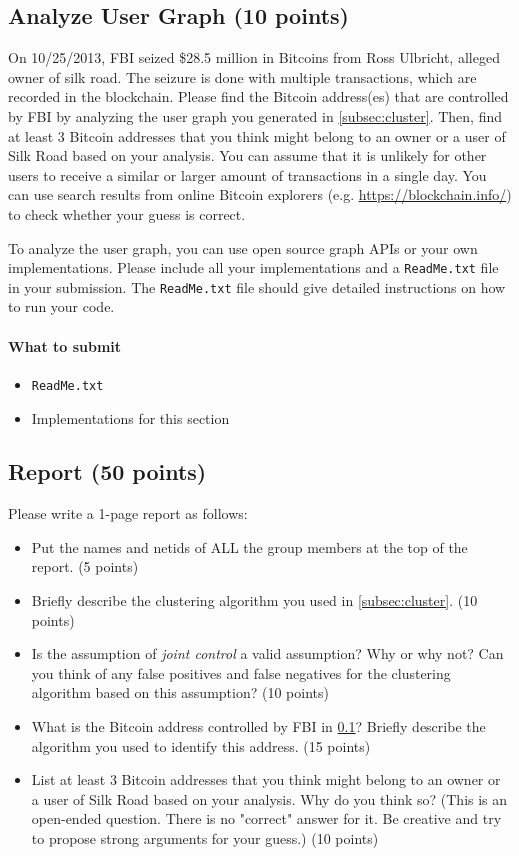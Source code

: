 \documentclass[letterpaper,12pt]{report}
\begin{document}
\subsection{Analyze User Graph (10 points)} \label{subsec:graph}
On 10/25/2013, FBI seized \$28.5 million in Bitcoins from Ross Ulbricht, alleged owner of silk road. The seizure is done with multiple transactions, which are recorded in the blockchain. Please find the Bitcoin address(es) that are controlled by FBI by analyzing the user graph you generated in \ref{subsec:cluster}. Then, find at least 3 Bitcoin addresses that you think might belong to an owner or a user of Silk Road based on your analysis. You can assume that it is unlikely for other users to receive a similar or larger amount of transactions in a single day. You can use search results from online Bitcoin explorers (e.g. \url{https://blockchain.info/}) to check whether your guess is correct. 

To analyze the user graph, you can use open source graph APIs or your own implementations. Please include all your implementations and a \texttt{ReadMe.txt} file in your submission. The \texttt{ReadMe.txt} file should give detailed instructions on how to run your code.  

\paragraph{What to submit}
\begin{itemize}
	\item \texttt{ReadMe.txt}
	\item Implementations for this section
\end{itemize}

\subsection{Report (50 points)}
Please write a 1-page report as follows: 
\begin{itemize}
	\item Put the names and netids of ALL the group members at the top of the report. (5 points)
	\item Briefly describe the clustering algorithm you used in \ref{subsec:cluster}. (10 points)
	\item Is the assumption of \textit{joint control} a valid assumption? Why or why not? Can you think of any false positives and false negatives for the clustering algorithm based on this assumption? (10 points)
	\item What is the Bitcoin address controlled by FBI in \ref{subsec:graph}? Briefly describe the algorithm you used to identify this address. (15 points)
	\item List at least 3 Bitcoin addresses that you think might belong to an owner or a user of Silk Road based on your analysis. Why do you think so? (This is an open-ended question. There is no "correct" answer for it. Be creative and try to propose strong arguments for your guess.) (10 points)
\end{itemize}
\end{document}
